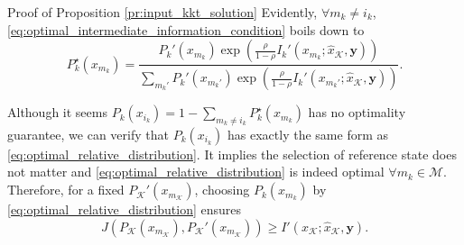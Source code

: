 \documentclass[journal]{IEEEtran}
\begin{document}
\begin{appendix}
\begin{subsection}{Proof of Proposition \ref{pr:input_kkt_solution}}
		Evidently, $\forall m_k \ne i_k$, \eqref{eq:optimal_intermediate_information_condition} boils down to
		\begin{equation}
			P_k^\star(x_{m_k}) = \frac{P_k'(x_{m_k}) \exp \left( \frac{\rho}{1 - \rho} I_k'(x_{m_k};\hat{x}_{\mathcal{K}},\boldsymbol{y}) \right)}{\sum_{m_k'} P_k'(x_{m_k'}) \exp \left( \frac{\rho}{1 - \rho} I_k'(x_{m_k'};\hat{x}_{\mathcal{K}},\boldsymbol{y}) \right)}.
			\label{eq:optimal_relative_distribution}
		\end{equation}

		Although it seems $P_k(x_{i_k}) = 1 - \sum_{m_k \ne i_k} P_k^\star(x_{m_k})$ has no optimality guarantee, we can verify that $P_k(x_{i_k})$ has exactly the same form as \eqref{eq:optimal_relative_distribution}.
		It implies the selection of reference state does not matter and \eqref{eq:optimal_relative_distribution} is indeed optimal $\forall m_k \in \mathcal{M}$.
		Therefore, for a fixed $P_{\mathcal{K}}'(x_{m_{\mathcal{K}}})$, choosing $P_k(x_{m_k})$ by \eqref{eq:optimal_relative_distribution} ensures
		\begin{equation}
			J \left( P_{\mathcal{K}}(x_{m_{\mathcal{K}}}),P_{\mathcal{K}}'(x_{m_{\mathcal{K}}}) \right) \ge I'(x_{\mathcal{K}};\hat{x}_{\mathcal{K}},\boldsymbol{y}).
			\label{eq:information_difference_lower}
		\end{equation}


\end{subsection}
\end{appendix}
\end{document}
